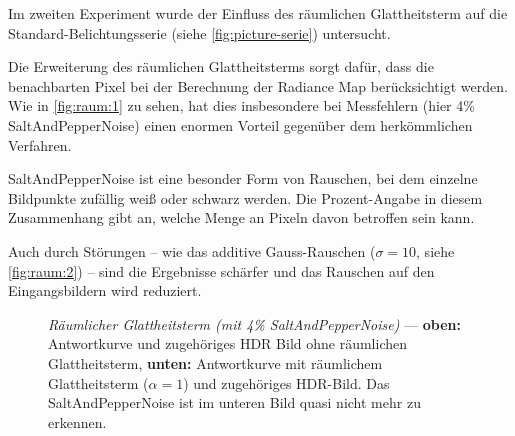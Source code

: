 Im zweiten Experiment wurde der Einfluss des räumlichen Glattheitsterm auf die Standard-Belichtungsserie (siehe \autoref{fig:picture-serie}) untersucht.

Die Erweiterung des räumlichen Glattheitsterms sorgt dafür, dass die benachbarten Pixel bei der Berechnung der \gls{Radiance Map} berücksichtigt werden. Wie in \autoref{fig:raum:1} zu sehen, hat dies insbesondere bei Messfehlern (hier 4\% \gls{SaltAndPepperNoise}) einen enormen Vorteil gegenüber dem herkömmlichen Verfahren.

\gls{SaltAndPepperNoise} ist eine besonder Form von Rauschen, bei dem einzelne Bildpunkte zufällig weiß oder schwarz werden. Die Prozent-Angabe in diesem Zusammenhang gibt an, welche Menge an Pixeln davon betroffen sein kann.

Auch durch Störungen -- wie das additive Gauss-Rauschen ($\sigma=10$, siehe \autoref{fig:raum:2}) -- sind die Ergebnisse schärfer und das Rauschen auf den Eingangsbildern wird reduziert.


\begin{figure}
  \begin{center}
    
    \caption{\textit{Räumlicher Glattheitsterm (mit 4\% \gls{SaltAndPepperNoise})} --- \textbf{oben:} Antwortkurve und zugehöriges HDR Bild ohne räumlichen Glattheitsterm, \textbf{unten:} Antwortkurve mit räumlichem Glattheitsterm ($\alpha = 1$) und zugehöriges HDR-Bild. Das \gls{SaltAndPepperNoise} ist im unteren Bild quasi nicht mehr zu erkennen.}
    \label{fig:raum:1}
  \end{center}
\end{figure}

